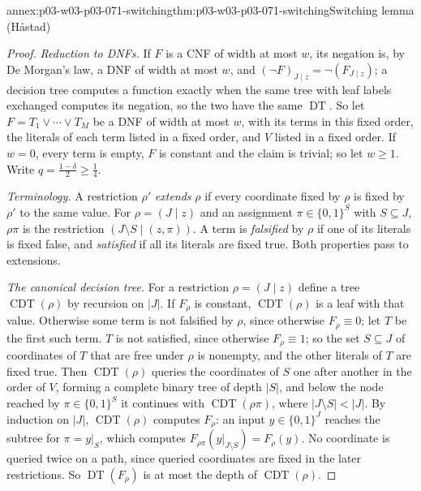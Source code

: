 \begin{annexitem}{annex:p03-w03-p03-071-switching}{thm:p03-w03-p03-071-switching}{Switching lemma (H\aa stad)}
\begin{proof}
\emph{Reduction to DNFs.}  If \(F\) is a CNF of width at most \(w\), its
negation is, by De Morgan's law, a DNF of width at most \(w\), and
\((\neg F)_{J\mid z}=\neg(F_{J\mid z})\); a decision tree computes a function
exactly when the same tree with leaf labels exchanged computes its negation,
so the two have the same \(\operatorname{DT}\).  So let \(F=T_1\vee\cdots\vee
T_M\) be a DNF of width at most \(w\), with its terms in this fixed order,
the literals of each term listed in a fixed order, and \(V\) listed in a
fixed order.  If \(w=0\), every term is empty, \(F\) is constant and the
claim is trivial; so let \(w\geq1\).  Write \(q=\frac{1-\delta}2\geq\frac14\).

\emph{Terminology.}  A restriction \(\rho'\) \emph{extends} \(\rho\) if every
coordinate fixed by \(\rho\) is fixed by \(\rho'\) to the same value.  For
\(\rho=(J\mid z)\) and an assignment \(\pi\in\{0,1\}^S\) with \(S\subseteq
J\), \(\rho\pi\) is the restriction \((J\setminus S\mid(z,\pi))\).  A term is
\emph{falsified} by \(\rho\) if one of its literals is fixed false, and
\emph{satisfied} if all its literals are fixed true.  Both properties pass to
extensions.

\emph{The canonical decision tree.}  For a restriction \(\rho=(J\mid z)\)
define a tree \(\operatorname{CDT}(\rho)\) by recursion on \(|J|\).  If
\(F_\rho\) is constant, \(\operatorname{CDT}(\rho)\) is a leaf with that
value.  Otherwise some term is not falsified by \(\rho\), since otherwise
\(F_\rho\equiv0\); let \(T\) be the first such term.  \(T\) is not satisfied,
since otherwise \(F_\rho\equiv1\); so the set \(S\subseteq J\) of
coordinates of \(T\) that are free under \(\rho\) is nonempty, and the other
literals of \(T\) are fixed true.  Then \(\operatorname{CDT}(\rho)\) queries
the coordinates of \(S\) one after another in the order of \(V\), forming a
complete binary tree of depth \(|S|\), and below the node reached by
\(\pi\in\{0,1\}^S\) it continues with \(\operatorname{CDT}(\rho\pi)\), where
\(|J\setminus S|<|J|\).  By induction on \(|J|\), \(\operatorname{CDT}(\rho)\)
computes \(F_\rho\): an input \(y\in\{0,1\}^J\) reaches the subtree for
\(\pi=y|_S\), which computes \(F_{\rho\pi}(y|_{J\setminus S})=F_\rho(y)\).
No coordinate is queried twice on a path, since queried coordinates are
fixed in the later restrictions.  So \(\operatorname{DT}(F_\rho)\) is at
most the depth of \(\operatorname{CDT}(\rho)\).


\end{proof}
\end{annexitem}
